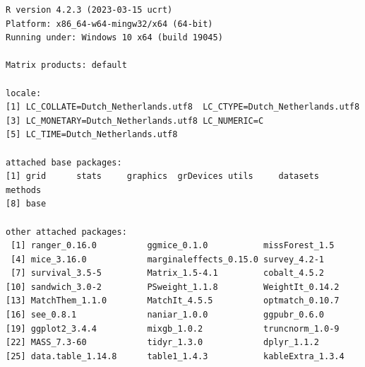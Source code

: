 \documentclass[
  letterpaper,
  DIV=11,
  numbers=noendperiod]{scrreprt}
\begin{document}
\begin{verbatim}
R version 4.2.3 (2023-03-15 ucrt)
Platform: x86_64-w64-mingw32/x64 (64-bit)
Running under: Windows 10 x64 (build 19045)

Matrix products: default

locale:
[1] LC_COLLATE=Dutch_Netherlands.utf8  LC_CTYPE=Dutch_Netherlands.utf8   
[3] LC_MONETARY=Dutch_Netherlands.utf8 LC_NUMERIC=C                      
[5] LC_TIME=Dutch_Netherlands.utf8    

attached base packages:
[1] grid      stats     graphics  grDevices utils     datasets  methods  
[8] base     

other attached packages:
 [1] ranger_0.16.0          ggmice_0.1.0           missForest_1.5        
 [4] mice_3.16.0            marginaleffects_0.15.0 survey_4.2-1          
 [7] survival_3.5-5         Matrix_1.5-4.1         cobalt_4.5.2          
[10] sandwich_3.0-2         PSweight_1.1.8         WeightIt_0.14.2       
[13] MatchThem_1.1.0        MatchIt_4.5.5          optmatch_0.10.7       
[16] see_0.8.1              naniar_1.0.0           ggpubr_0.6.0          
[19] ggplot2_3.4.4          mixgb_1.0.2            truncnorm_1.0-9       
[22] MASS_7.3-60            tidyr_1.3.0            dplyr_1.1.2           
[25] data.table_1.14.8      table1_1.4.3           kableExtra_1.3.4      


\end{verbatim}
\end{document}

